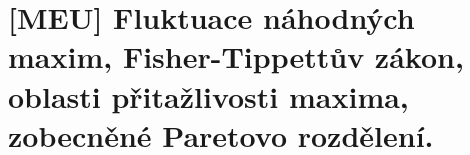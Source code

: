 \chapter{[MEU] Fluktuace náhodných maxim, Fisher-Tippettův zákon, oblasti přitažlivosti maxima, zobecněné Paretovo rozdělení.}
